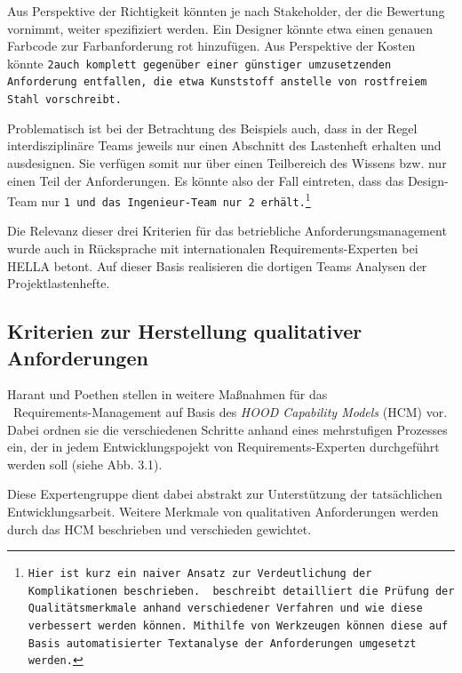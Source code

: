 \documentclass[12pt]{report}
\begin{document}
Aus Perspektive der Richtigkeit könnten je nach Stakeholder, der die Bewertung vornimmt, weiter spezifiziert werden. Ein Designer könnte etwa einen genauen Farbcode zur Farbanforderung \glqq rot\grqq{} hinzufügen. Aus Perspektive der Kosten könnte \tt 2\rm auch komplett gegenüber einer günstiger umzusetzenden Anforderung entfallen, die etwa \glqq Kunststoff\grqq{} anstelle von \glqq rostfreiem Stahl\grqq{} vorschreibt.

Problematisch ist bei der Betrachtung des Beispiels auch, dass in der Regel interdisziplinäre Teams jeweils nur einen Abschnitt des Lastenheft erhalten und ausdesignen. Sie verfügen somit nur über einen Teilbereich des Wissens bzw. nur einen Teil der Anforderungen. Es könnte also der Fall eintreten, dass das Design-Team nur \tt 1 \rm und das Ingenieur-Team nur \tt 2 \rm erhält.\footnote{Hier ist kurz ein naiver Ansatz zur Verdeutlichung der Komplikationen beschrieben. \cite{zg02} beschreibt detailliert die Prüfung der Qualitätsmerkmale anhand verschiedener Verfahren und wie diese verbessert werden können. Mithilfe von Werkzeugen können diese auf Basis automatisierter Textanalyse der Anforderungen umgesetzt werden.}

Die Relevanz dieser drei Kriterien für das betriebliche Anforderungsmanagement wurde auch in Rücksprache mit internationalen Requirements-Experten bei HELLA betont. Auf dieser Basis realisieren die dortigen Teams Analysen der Projektlastenhefte. 

\subsection{Kriterien zur Herstellung qualitativer Anforderungen}
Harant und Poethen stellen in \cite{hp12} weitere Maßnahmen für das \\\ Requirements-Management auf Basis des \textit{HOOD Capability Models} (HCM) vor. Dabei ordnen sie die verschiedenen Schritte anhand eines mehrstufigen Prozesses ein, der in jedem Entwicklungspojekt von Requirements-Experten durchgeführt werden soll (siehe Abb. 3.1). 

Diese Expertengruppe dient dabei abstrakt zur Unterstützung der tatsächlichen Entwicklungsarbeit. Weitere Merkmale von qualitativen Anforderungen werden durch das HCM beschrieben und verschieden gewichtet. 
\end{document}
